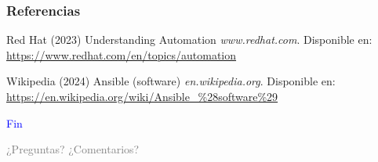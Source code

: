 \documentclass[
	11pt, %
]{beamer}
\begin{document}
\begin{frame} %
	\frametitle{Referencias}
	
	\begin{thebibliography}{99} %
		\footnotesize %
		
                Red Hat (2023)
                \newblock Understanding Automation
                \newblock \emph{www.redhat.com}. Disponible en: \url{https://www.redhat.com/en/topics/automation}
   
                Wikipedia (2024)
                \newblock Ansible (software)
                \newblock \emph{en.wikipedia.org}. Disponible en: \url{https://en.wikipedia.org/wiki/Ansible\_\%28software\%29}

	\end{thebibliography}
\end{frame}


\begin{frame}[plain]
	\begin{center}
		{\Huge \textcolor{blue}{Fin}}
		
		\bigskip\bigskip
		
		{\LARGE \textcolor{gray}{¿Preguntas? ¿Comentarios?}}
	\end{center}
\end{frame}

\end{document}
